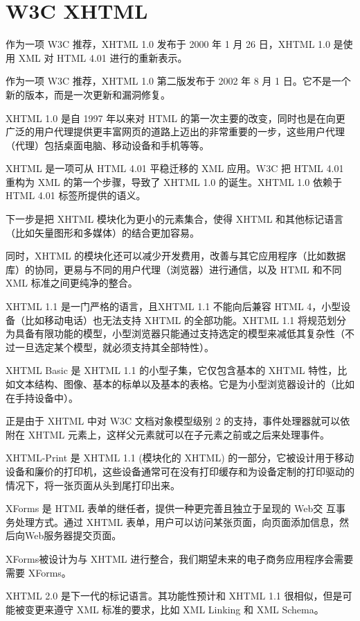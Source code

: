 \section{W3C XHTML}

作为一项 W3C 推荐，XHTML 1.0 发布于 2000 年 1 月 26 日，XHTML 1.0 是使用 XML 对 HTML 4.01 进行的重新表示。

作为一项 W3C 推荐，XHTML 1.0 第二版发布于 2002 年 8 月 1 日。它不是一个新的版本，而是一次更新和漏洞修复。

XHTML 1.0 是自 1997 年以来对 HTML 的第一次主要的改变，同时也是在向更广泛的用户代理提供更丰富网页的道路上迈出的非常重要的一步，这些用户代理（代理）包括桌面电脑、移动设备和手机等等。

XHTML 是一项可从 HTML 4.01 平稳迁移的 XML 应用。W3C 把 HTML 4.01 重构为 XML 的第一个步骤，导致了 XHTML 1.0 的诞生。XHTML 1.0 依赖于 HTML 4.01 标签所提供的语义。

下一步是把 XHTML 模块化为更小的元素集合，使得 XHTML 和其他标记语言（比如矢量图形和多媒体）的结合更加容易。

同时，XHTML 的模块化还可以减少开发费用，改善与其它应用程序（比如数据库）的协同，更易与不同的用户代理（浏览器）进行通信，以及 HTML 和不同 XML 标准之间更纯净的整合。


XHTML 1.1 是一门严格的语言，且XHTML 1.1 不能向后兼容 HTML 4，小型设备（比如移动电话）也无法支持 XHTML 的全部功能。XHTML 1.1 将规范划分为具备有限功能的模型，小型浏览器只能通过支持选定的模型来减低其复杂性（不过一旦选定某个模型，就必须支持其全部特性）。

XHTML Basic 是 XHTML 1.1 的小型子集，它仅包含基本的 XHTML 特性，比如文本结构、图像、基本的标单以及基本的表格。它是为小型浏览器设计的（比如在手持设备中）。

正是由于 XHTML 中对 W3C 文档对象模型级别 2 的支持，事件处理器就可以依附在 XHTML 元素上，这样父元素就可以在子元素之前或之后来处理事件。

XHTML-Print 是 XHTML 1.1 (模块化的 XHTML) 的一部分，它被设计用于移动设备和廉价的打印机，这些设备通常可在没有打印缓存和为设备定制的打印驱动的情况下，将一张页面从头到尾打印出来。

XForms 是 HTML 表单的继任者，提供一种更完善且独立于呈现的 Web交 互事务处理方式。通过 XHTML 表单，用户可以访问某张页面，向页面添加信息，然后向Web服务器提交页面。

XForms被设计为与 XHTML 进行整合，我们期望未来的电子商务应用程序会需要需要 XForms。

XHTML 2.0 是下一代的标记语言。其功能性预计和 XHTML 1.1 很相似，但是可能被变更来遵守 XML 标准的要求，比如 XML Linking 和 XML Schema。

